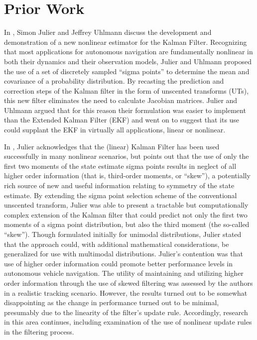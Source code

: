 \chapter{Prior Work}

In \cite{Julier1997}, Simon Julier and Jeffrey Uhlmann discuss the development and demonstration of a new nonlinear estimator for the Kalman Filter. Recognizing that most applications for autonomous navigation are fundamentally nonlinear in both their dynamics and their observation models, Julier and Uhlmann proposed the use of a set of discretely sampled ``sigma points'' to determine the mean and covariance of a probability distribution. By recasting the prediction and correction steps of the Kalman filter in the form of unscented transforms (UTs), this new filter eliminates the need to calculate Jacobian matrices. Julier and Uhlmann argued that for this reason their formulation was easier to implement than the Extended Kalman Filter (EKF) and went on to suggest that its use could supplant the EKF in virtually all applications, linear or nonlinear.

In \cite{Julier1998}, Julier acknowledges that the (linear) Kalman Filter has been used successfully in many nonlinear scenarios, but points out that the use of only the first two moments of the state estimate sigma points results in neglect of all higher order information (that is, third-order moments, or ``skew''), a potentially rich source of new and useful information relating to symmetry of the state estimate. By extending the sigma point selection scheme of the conventional unscented transform, Julier was able to present a tractable but computationally complex extension of the Kalman filter that could predict not only the first two moments of a sigma point distribution, but also the third moment (the so-called ``skew''). Though formulated initially for unimodal distributions, Julier stated that the approach could, with additional mathematical considerations, be generalized for use with multimodal distributions. Julier's contention was that use of higher order information could promote better performance levels in autonomous vehicle navigation. The utility of maintaining and utilizing higher order information through the use of skewed filtering was assessed by the authors in a realistic tracking scenario. However, the results turned out to be somewhat disappointing as the change in performance turned out to be minimal, presumably due to the linearity of the filter's update rule. Accordingly, research in this area continues, including examination of the use of nonlinear update rules in the filtering process.

